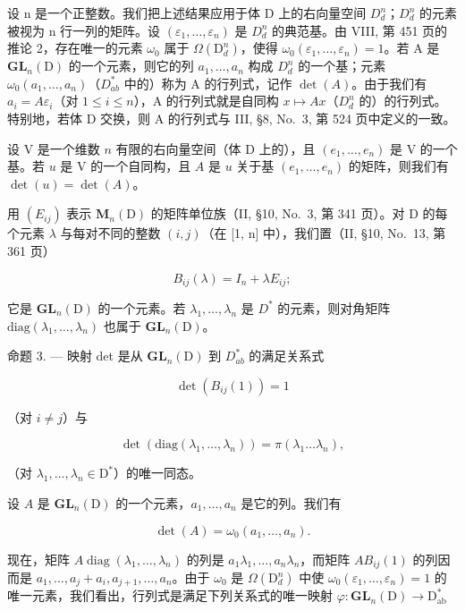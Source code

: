 设 n 是一个正整数。我们把上述结果应用于体 D 上的右向量空间 \(D_{d}^{n}\)；\(D_{d}^{n}\) 的元素被视为 n 行一列的矩阵。设 \((\varepsilon_{1},\ldots,\varepsilon_{n})\) 是 \(D_{d}^{n}\) 的典范基。由 VIII, 第 451 页的推论 2，存在唯一的元素 \(\omega_{0}\) 属于 \(\Omega(\mathrm{D}_{d}^{n})\)，使得 \(\omega_{0}(\varepsilon_{1},\ldots,\varepsilon_{n})=1\)。若 A 是 \(\mathbf{GL}_{n}(\mathrm{D})\) 的一个元素，则它的列 \(a_{1},\ldots,a_{n}\) 构成 \(D_{d}^{n}\) 的一个基；元素 \(\omega_{0}(a_{1},\ldots,a_{n})\)（\(D_{ab}^{*}\) 中的）称为 A 的行列式，记作 \(\det(A)\)。由于我们有 \(a_{i}=A\varepsilon_{i}\)（对 \(1\leqslant i\leqslant n\)），A 的行列式就是自同构 \(x\mapsto Ax\)（\(D_{d}^{n}\) 的）的行列式。特别地，若体 D 交换，则 A 的行列式与 III, §8, No.~3, 第 524 页中定义的一致。

设 \(\mathrm{V}\) 是一个维数 \(n\) 有限的右向量空间（体 \(\mathrm{D}\) 上的），且 \((e_1, \ldots, e_n)\) 是 \(\mathrm{V}\) 的一个基。若 \(u\) 是 \(\mathrm{V}\) 的一个自同构，且 \(A\) 是 \(u\) 关于基 \((e_1, \ldots, e_n)\) 的矩阵，则我们有 \(\det(u) = \det(A)\)。

用 \((E_{ij})\) 表示 \(\mathbf{M}_{n}(\mathrm{D})\) 的矩阵单位族（II, §10, No.~3, 第 341 页）。对 D 的每个元素 \(\lambda\) 与每对不同的整数 \((i,j)\)（在 {[}1, n{]} 中），我们置（II, §10, No.~13, 第 361 页）

\[
B _ {i j} (\lambda) = I _ {n} + \lambda E _ {i j};
\]

它是 \(\mathbf{GL}_{n}(\mathrm{D})\) 的一个元素。若 \(\lambda_{1},\ldots,\lambda_{n}\) 是 \(D^{*}\) 的元素，则对角矩阵 \(\mathrm{diag}(\lambda_{1},\ldots,\lambda_{n})\) 也属于 \(\mathbf{GL}_{n}(\mathrm{D})\)。

命题 3. --- 映射 det 是从 \(\mathbf{GL}_{n}(\mathrm{D})\) 到 \(D_{ab}^{*}\) 的满足关系式

\[
\det (B _ {i j} (1)) = 1\tag{16}
\]

（对 \(i\neq j\)）与

\[
\det (\mathrm{diag} (\lambda_ {1}, \ldots , \lambda_ {n})) = \pi (\lambda_ {1} \dots \lambda_ {n}),\tag{17}
\]

（对 \(\lambda_1, \ldots, \lambda_n \in \mathrm{D}^*\)）的唯一同态。

设 \(A\) 是 \(\mathbf{GL}_n(\mathrm{D})\) 的一个元素，\(a_1, \ldots, a_n\) 是它的列。我们有

\[
\det (A) = \omega_ {0} (a _ {1}, \dots , a _ {n}).
\]

现在，矩阵 \(A \operatorname{diag}(\lambda_1, \ldots, \lambda_n)\) 的列是 \(a_1\lambda_1, \ldots, a_n\lambda_n\)，而矩阵 \(AB_{ij}(1)\) 的列因而是 \(a_1, \ldots, a_j + a_i, a_{j+1}, \ldots, a_n\)。由于 \(\omega_0\) 是 \(\Omega(\mathrm{D}_d^n)\) 中使 \(\omega_0(\varepsilon_1, \ldots, \varepsilon_n) = 1\) 的唯一元素，我们看出，行列式是满足下列关系式的唯一映射 \(\varphi: \mathbf{GL}_n(\mathrm{D}) \to \mathrm{D}_{\mathrm{ab}}^*\)

